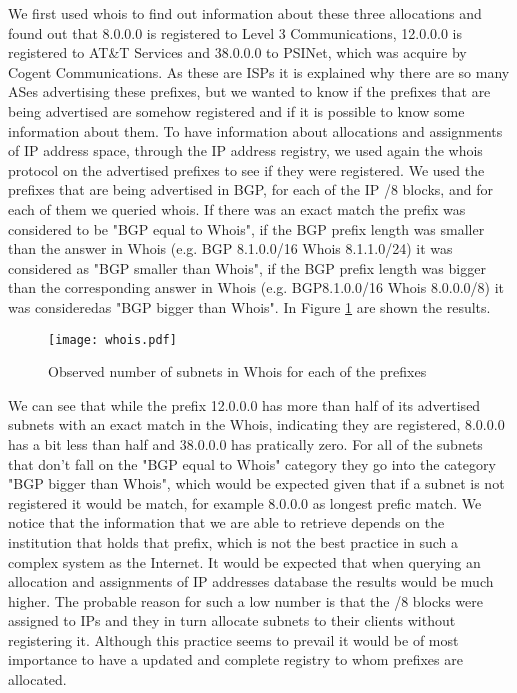 \documentclass[11pt,a4paper]{scrreprt}
\begin{document}
We first used whois to find out information about these three allocations and found out that 8.0.0.0 is registered to Level 3 Communications, 12.0.0.0 is registered to AT\&T Services and 38.0.0.0 to PSINet, which was acquire by Cogent Communications.
As these are ISPs it is explained why there are so many ASes advertising these prefixes, but we wanted to know if the prefixes that are being advertised are somehow registered and if it is possible to know some information about them.
To have information about allocations and assignments of IP address space, through the IP address registry, we used again the whois protocol on the advertised prefixes to see if they were registered. We used the prefixes that are being advertised in BGP, for each of the IP /8 blocks, and for each of them we queried whois.
If there was an exact match the prefix was considered to be "BGP equal to Whois", if the BGP prefix length was smaller than the answer in Whois (e.g. BGP 8.1.0.0/16 Whois 8.1.1.0/24) it was considered as "BGP smaller than Whois", if the BGP prefix length was bigger than the corresponding answer in Whois (e.g. BGP8.1.0.0/16 Whois 8.0.0.0/8) it was consideredas "BGP bigger than Whois". In Figure \ref{fig:whois} are shown the results.

\begin{figure}[!h]
\centering
\texttt{[image: whois.pdf]}
\caption{Observed number of subnets in Whois for each of the prefixes}
\label{fig:whois}
\end{figure}

We can see that while the prefix 12.0.0.0 has more than half of its advertised subnets with an exact match in the Whois, indicating they are registered, 8.0.0.0 has a bit less than half and 38.0.0.0 has pratically zero. For all of the subnets that don't fall on the "BGP equal to Whois" category they go into the category "BGP bigger than Whois", which would be expected given that if a subnet is not registered it would be match, for example 8.0.0.0 as longest prefic match.
We notice that the information that we are able to retrieve depends on the institution that holds that prefix, which is not the best practice in such a complex system as the Internet. It would be expected that when querying an allocation and assignments of IP addresses database the results would be much higher. The probable reason for such a low number is that the /8 blocks were assigned to IPs and they in turn allocate subnets to their clients without registering it. Although this practice seems to prevail it would be of most importance to have a updated and complete registry to whom prefixes are allocated.
\end{document}
